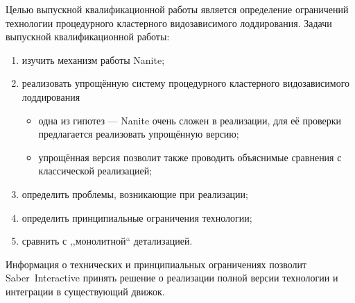 Целью выпускной квалификационной работы является определение ограничений технологии процедурного кластерного видозависимого лоддирования.
Задачи выпускной квалификационной работы:
\begin{enumerate}
    \item изучить механизм работы Nanite;
    \item реализовать упрощённую систему процедурного кластерного видозависимого лоддирования
    \begin{itemize}
        \item одна из гипотез --- Nanite очень сложен в реализации, для её проверки предлагается реализовать упрощённую версию;
        \item упрощённая версия позволит также проводить объяснимые сравнения с классической реализацией;
    \end{itemize}
    \item определить проблемы, возникающие при реализации;
    \item определить принципиальные ограничения технологии;
    \item сравнить с ,,монолитной`` детализацией.
\end{enumerate}

Информация о технических и принципиальных ограничениях позволит Saber~Interactive принять решение о реализации полной версии технологии и интеграции в существующий движок.
